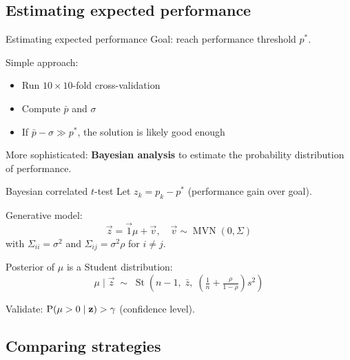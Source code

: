 \subsection{Estimating expected performance}

\begin{frame}{Estimating expected performance}
  Goal: reach performance threshold $p^*$.

  \vspace{0.3cm}
  Simple approach:
  \begin{itemize}
    \item Run $10 \times 10$-fold cross-validation
    \item Compute $\bar{p}$ and $\sigma$
    \item If $\bar{p} - \sigma \gg p^*$, the solution is likely good enough
  \end{itemize}

  \vspace{0.3cm}
  More sophisticated: \textbf{Bayesian analysis} to estimate the
  probability distribution of performance.
\end{frame}

\begin{frame}{Bayesian correlated $t$-test}
  Let $z_k = p_k - p^*$ (performance gain over goal).

  \vspace{0.2cm}
  Generative model:
  \[
    \vec{z} = \vec{1}\mu + \vec{v}, \quad
    \vec{v} \sim \operatorname{MVN}(0, \Sigma)
  \]
  with $\Sigma_{ii} = \sigma^2$ and $\Sigma_{ij} = \sigma^2 \rho$ for $i \neq j$.

  \vspace{0.2cm}
  Posterior of $\mu$ is a Student distribution:
  \[
    \mu \mid \vec{z} \;\sim\; \operatorname{St}\!\left(n{-}1,\; \bar{z},\;
      \left(\tfrac{1}{n} + \tfrac{\rho}{1-\rho}\right) s^2 \right)
  \]

  \vspace{0.2cm}
  Validate: $\operatorname{P}(\mu > 0 \mid \mathbf{z}) > \gamma$ (confidence level).
\end{frame}

\subsection{Comparing strategies}

